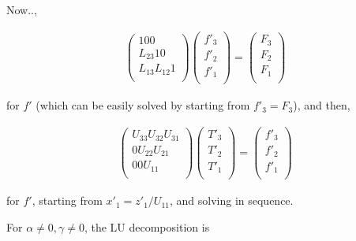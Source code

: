 Now..,

\begin{eqnarray}
  \left( \begin{array}{lll}
         1       0       0      \\
         L_{23}  1       0      \\
         L_{13}  L_{12}  1      \\
         \end{array} \right)
  \left( \begin{array}{l}
         f'_3 \\ f'_2 \\ f'_1 \\
         \end{array} \right)
  =
  \left(  \begin{array}{l}
          F_3 \\ F_2 \\ F_1 \\
          \end{array} \right)
\end{eqnarray}

for \(f'\) (which can be easily solved by starting from \(f'_3=F_3\)), and then,

\begin{eqnarray}
  \left( \begin{array}{lll}
         U_{33}  U_{32}  U_{31} \\
         0       U_{22}  U_{21} \\
         0       0       U_{11} \\
         \end{array} \right)
  \left( \begin{array}{l}
         T'_3 \\ T'_2 \\ T'_1 \\
         \end{array} \right)
  =
  \left(  \begin{array}{l}
          f'_3 \\ f'_2 \\ f'_1 \\
          \end{array} \right)
\end{eqnarray}

for \(f'\), starting from \(x'_1=z'_1/U_{11}\), and solving in sequence.

For \(\alpha \neq 0, \gamma \neq 0\), the LU decomposition is

